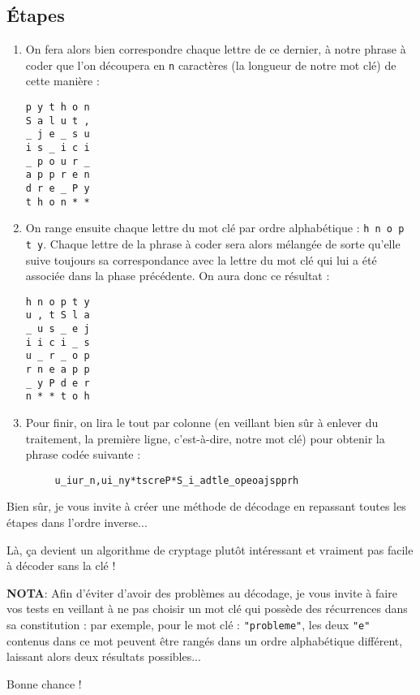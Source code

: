\subsection*{Étapes}
\begin{enumerate}
	\item On fera alors bien correspondre chaque lettre de ce dernier, à notre phrase à coder que l'on découpera en \texttt{n} caractères (la longueur de notre mot clé) de cette manière :
	\begin{verbatim}
p y t h o n
S a l u t ,
_ j e _ s u
i s _ i c i
_ p o u r _
a p p r e n
d r e _ P y
t h o n * *
	\end{verbatim}
	\medskip
	
	\item On range ensuite chaque lettre du mot clé par ordre alphabétique : \texttt{h n o p t y}. Chaque lettre de la phrase à coder sera alors mélangée de sorte qu'elle suive toujours sa correspondance avec la lettre du mot clé qui lui a été associée dans la phase précédente. On aura donc ce résultat :
	\begin{verbatim}
h n o p t y
u , t S l a
_ u s _ e j
i i c i _ s
u _ r _ o p
r n e a p p
_ y P d e r
n * * t o h
	\end{verbatim}
	\medskip
	
	\item Pour finir, on lira le tout par colonne (en veillant bien sûr à enlever du traitement, la première ligne, c'est-à-dire, notre mot clé) pour obtenir la phrase codée suivante :
	\begin{verbatim}	 u_iur_n,ui_ny*tscreP*S_i_adtle_opeoajspprh
	\end{verbatim}
\end{enumerate}
\medskip

Bien sûr, je vous invite à créer une méthode de décodage en repassant toutes les étapes dans l'ordre inverse...
\medskip

Là, ça devient un algorithme de cryptage plutôt intéressant et vraiment pas facile à décoder sans la clé !
\medskip

\textbf{NOTA}: Afin d'éviter d'avoir des problèmes au décodage, je vous invite à faire vos tests en veillant à ne pas choisir un mot clé qui possède des récurrences dans sa constitution : par exemple, pour le mot clé : \texttt{"probleme"}, les deux \texttt{"e"} contenus dans ce mot peuvent être rangés dans un ordre alphabétique différent, laissant alors deux résultats possibles...
\medskip

Bonne chance !